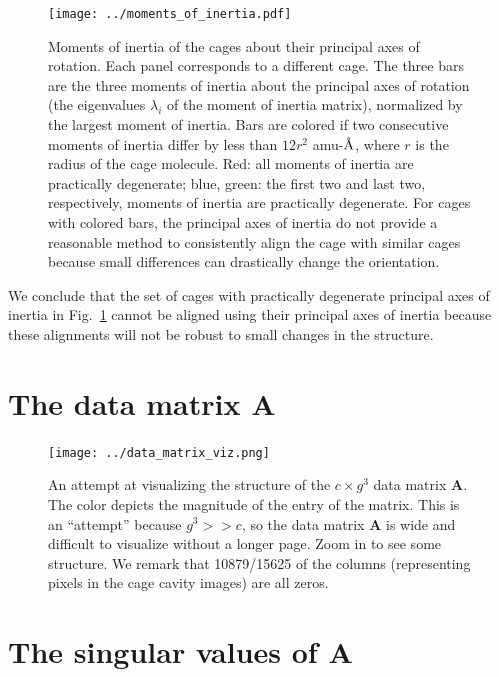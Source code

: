 \documentclass[journal=jacsat,manuscript=article]{achemso}
\newcommand{\angstrom}{\mbox{\normalfont\AA}}
\begin{document}
{\begin{figure}
\centering
\texttt{[image: ../moments\_of\_inertia.pdf]}
	\caption{{\color{red} Moments of inertia of the cages about their principal axes of rotation. Each panel corresponds to a different cage. The three bars are the three moments of inertia about the principal axes of rotation (the eigenvalues $\lambda_i$ of the moment of inertia matrix), normalized by the largest moment of inertia. Bars are colored if two consecutive moments of inertia differ by less than $12 r^2$ amu-$\angstrom$, where $r$ is the radius of the cage molecule. Red: all moments of inertia are practically degenerate; blue, green: the first two and last two, respectively, moments of inertia are practically degenerate. For cages with colored bars, the principal axes of inertia do not provide a reasonable method to consistently align the cage with similar cages because small differences can drastically change the orientation.
	}%
	} \label{fig:moments_of_inertia}
\end{figure}

We conclude that the set of cages with practically degenerate principal axes of inertia in Fig.~\ref{fig:moments_of_inertia} cannot be aligned using their principal axes of inertia because these alignments will not be robust to small changes in the structure.


} %

\newpage

\section{The data matrix $\mathbf{A}$}

\begin{figure}
\centering
	\texttt{[image: ../data\_matrix\_viz.png]}
	\caption{An attempt at visualizing the structure of the $c \times g^3$ data matrix $\mathbf{A}$. The color depicts the magnitude of the entry of the matrix. This is an ``attempt'' because $g^3>>c$, so the data matrix $\mathbf{A}$ is wide and difficult to visualize without a longer page. Zoom in to see some structure. We remark that 10879/15625 of the columns (representing pixels in the cage cavity images) are all zeros.
	} \label{fig:data_matrix}
\end{figure}

\newpage
\clearpage

\section{The singular values of $\mathbf{A}$}
\end{document}
